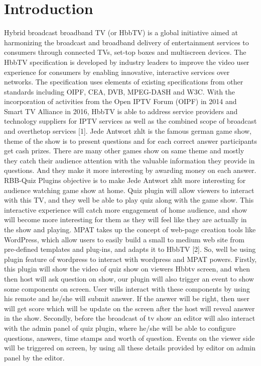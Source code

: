 \section{\textbf{Introduction}}\label{sec:Introduction}
Hybrid broadcast broadband TV (or HbbTV) is a global
initiative aimed at harmonizing the broadcast and broadband
delivery of entertainment services to consumers through
connected TVs, set-top boxes and multiscreen devices. The
HbbTV specification is developed by industry leaders to improve
the video user experience for consumers by enabling innovative,
interactive services over networks. The specification
uses elements of existing specifications from other standards
including OIPF, CEA, DVB, MPEG-DASH and W3C. With
the incorporation of activities from the Open IPTV Forum
(OIPF) in 2014 and Smart TV Alliance in 2016, HbbTV is able
to address service providers and technology suppliers for IPTV
services as well as the combined scope of broadcast and overthetop services [1]. Jede Antwort zhlt is the famous german
game show, theme of the show is to present questions and
for each correct answer participants get cash prizes. There are many other games show on same theme and mostly they catch
their audience attention with the valuable information they
provide in questions. And they make it more interesting by
awarding money on each answer. RBB-Quiz Plugins objective
is to make Jede Antwort zhlt more interesting for audience
watching game show at home. Quiz plugin will allow viewers
to interact with this TV, and they well be able to play quiz
along with the game show. This interactive experience will
catch more engagement of home audience, and show will
become more interesting for them as they will feel like they are
actually in the show and playing. MPAT takes up the concept
of web-page creation tools like WordPress, which allow users
to easily build a small to medium web site from pre-defined
templates and plug-ins, and adapts it to HbbTV [2]. So, well
be using plugin feature of wordpress to interact with wordpress
and MPAT powers. Firstly, this plugin will show the video of
quiz show on viewers Hbbtv screen, and when then host will
ask question on show, our plugin will also trigger an event
to show some components on screen. User wills interact with
these components by using his remote and he/she will submit
answer. If the answer will be right, then user will get score
which will be update on the screen after the host will reveal
answer in the show. Secondly, before the broadcast of tv show
an editor will also interact with the admin panel of quiz plugin,
where he/she will be able to configure questions, answers,
time stamps and worth of question. Events on the viewer side
will be triggered on screen, by using all these details provided
by editor on admin panel by the editor.
